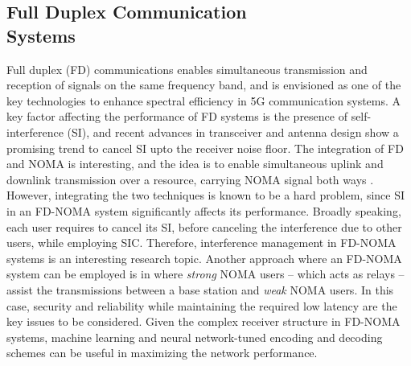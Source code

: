 \begin{multicols}{2}
\subsection{Full Duplex Communication\\ Systems}
Full duplex (FD) communications enables simultaneous transmission and reception of signals on the same frequency band, and is envisioned as one of the key technologies to enhance spectral efficiency in 5G communication systems. A key factor affecting the performance of FD systems is the presence of self-interference (SI), and recent advances in transceiver and antenna design show a promising trend to cancel SI upto the receiver noise floor. The integration of FD and NOMA is interesting, and the idea is to enable simultaneous uplink and downlink transmission over a resource, carrying NOMA signal both ways \cite{Mohammadi_ComMag_2019}. However, integrating the two techniques is known to be a hard problem, since SI in an FD-NOMA system significantly affects its performance. Broadly speaking, each user requires to cancel its SI, before canceling the interference due to other users, while employing SIC. Therefore, interference management in FD-NOMA systems is an interesting research topic. Another approach where an FD-NOMA system can be employed is in where \emph{strong} NOMA users -- which acts as relays -- assist the transmissions between a base station and \emph{weak} NOMA users. In this case, security and reliability while maintaining the required low latency are the key issues to be considered. Given the complex receiver structure in FD-NOMA systems, machine learning and neural network-tuned encoding and decoding schemes can be useful in maximizing the network performance.


\end{multicols}

